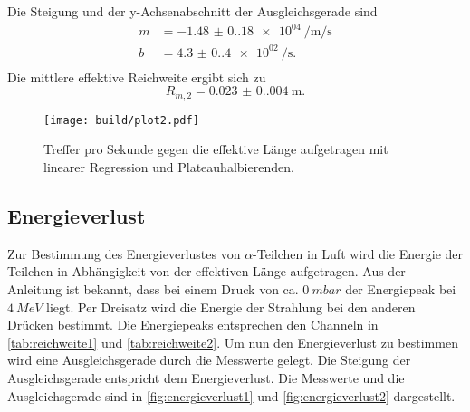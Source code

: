 Die Steigung und der y-Achsenabschnitt der Ausgleichsgerade sind
\begin{align*}
  m &= \SI{-1.48(0.18)e04}{\per\meter\per\second} \\
  b &= \SI{4.3(0.4)e02}{\per\second}.\\
\end{align*}
Die mittlere effektive Reichweite ergibt sich zu
\begin{equation*}
  R_{m,2} = \SI{0.023(0.004)}{\meter}.
\end{equation*}

\begin{figure}[H]
  \centering
  \texttt{[image: build/plot2.pdf]}
  \caption{Treffer pro Sekunde gegen die effektive Länge aufgetragen mit linearer Regression und Plateauhalbierenden.}
  \label{fig:reichweite2}
\end{figure}


\subsection{Energieverlust}
\label{sec:energieverlust}

Zur Bestimmung des Energieverlustes von $\alpha$-Teilchen in Luft wird die Energie der Teilchen in Abhängigkeit von der effektiven Länge aufgetragen.
Aus der Anleitung ist bekannt, dass bei einem Druck von ca. $\SI{0}{mbar}$ der Energiepeak bei $\SI{4}{MeV}$ liegt.
Per Dreisatz wird die Energie der Strahlung bei den anderen Drücken bestimmt. 
Die Energiepeaks entsprechen den Channeln in \autoref{tab:reichweite1} und \autoref{tab:reichweite2}.
Um nun den Energieverlust zu bestimmen wird eine Ausgleichsgerade durch die Messwerte gelegt.
Die Steigung der Ausgleichsgerade entspricht dem Energieverlust.
Die Messwerte und die Ausgleichsgerade sind in \autoref{fig:energieverlust1} und \autoref{fig:energieverlust2} dargestellt.

